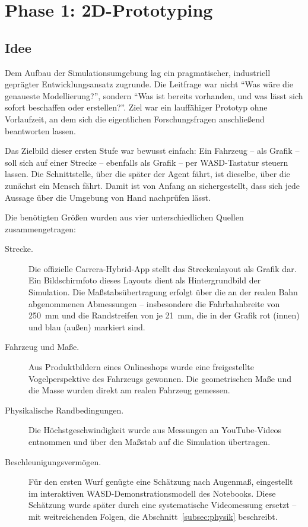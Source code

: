 \chapter{Phase 1: 2D-Prototyping}
\label{chap:phase1}
\label{sec:phase1}

\section{Idee}
\label{subsec:idee}

Dem Aufbau der Simulationsumgebung lag ein pragmatischer, industriell geprägter Entwicklungsansatz zugrunde. Die Leitfrage war nicht \enquote{Was wäre die genaueste Modellierung?}, sondern \enquote{Was ist bereits vorhanden, und was lässt sich sofort beschaffen oder erstellen?}. Ziel war ein lauffähiger Prototyp ohne Vorlaufzeit, an dem sich die eigentlichen Forschungsfragen anschließend beantworten lassen.

Das Zielbild dieser ersten Stufe war bewusst einfach: Ein Fahrzeug -- als Grafik -- soll sich auf einer Strecke -- ebenfalls als Grafik -- per WASD-Tastatur steuern lassen. Die Schnittstelle, über die später der Agent fährt, ist dieselbe, über die zunächst ein Mensch fährt. Damit ist von Anfang an sichergestellt, dass sich jede Aussage über die Umgebung von Hand nachprüfen lässt.

Die benötigten Größen wurden aus vier unterschiedlichen Quellen zusammengetragen:

\begin{description}
  \item[Strecke.] Die offizielle Carrera-Hybrid-App stellt das Streckenlayout als Grafik dar. Ein Bildschirmfoto dieses Layouts dient als Hintergrundbild der Simulation. Die Maßstabsübertragung erfolgt über die an der realen Bahn abgenommenen Abmessungen -- insbesondere die Fahrbahnbreite von \SI{250}{\milli\meter} und die Randstreifen von je \SI{21}{\milli\meter}, die in der Grafik rot (innen) und blau (außen) markiert sind.
  \item[Fahrzeug und Maße.] Aus Produktbildern eines Onlineshops wurde eine freigestellte Vogelperspektive des Fahrzeugs gewonnen. Die geometrischen Maße und die Masse wurden direkt am realen Fahrzeug gemessen.
  \item[Physikalische Randbedingungen.] Die Höchstgeschwindigkeit wurde aus Messungen an YouTube-Videos entnommen und über den Maßstab auf die Simulation übertragen.
  \item[Beschleunigungsvermögen.] Für den ersten Wurf genügte eine Schätzung nach Augenmaß, eingestellt im interaktiven WASD-Demonstrationsmodell des Notebooks. Diese Schätzung wurde später durch eine systematische Videomessung ersetzt -- mit weitreichenden Folgen, die Abschnitt~\ref{subsec:physik} beschreibt.
\end{description}

